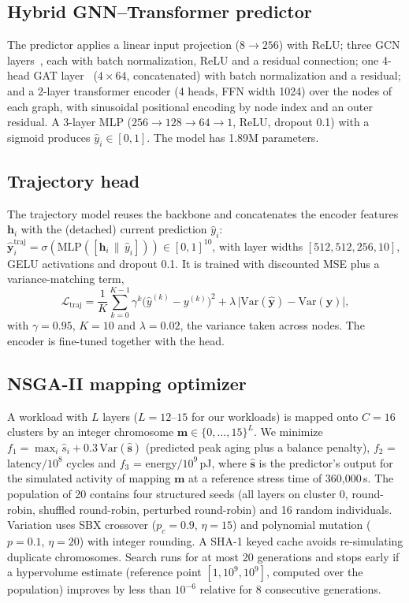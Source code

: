 \documentclass[conference]{IEEEtran}
\begin{document}
\subsection{Hybrid GNN--Transformer predictor}
\label{sec:model}

The predictor applies a linear input projection ($8 \to 256$) with ReLU; three GCN layers~\cite{kipf2017gcn}, each with batch normalization, ReLU and a residual connection; one 4-head GAT layer~\cite{velickovic2018gat} ($4\times 64$, concatenated) with batch normalization and a residual; and a 2-layer transformer encoder (4 heads, FFN width 1024) over the nodes of each graph, with sinusoidal positional encoding by node index and an outer residual. A 3-layer MLP ($256 \to 128 \to 64 \to 1$, ReLU, dropout 0.1) with a sigmoid produces $\hat{y}_i \in [0,1]$. The model has 1.89M parameters.

\subsection{Trajectory head}
\label{sec:trajectory}

The trajectory model reuses the backbone and concatenates the encoder features $\mathbf{h}_i$ with the (detached) current prediction $\hat{y}_i$:
$\hat{\mathbf{y}}_i^{\text{traj}} = \sigma(\text{MLP}([\mathbf{h}_i \,\|\, \hat{y}_i])) \in [0,1]^{10}$, with layer widths $[512, 512, 256, 10]$, GELU activations and dropout 0.1. It is trained with discounted MSE plus a variance-matching term,
\begin{equation}
    \mathcal{L}_{\text{traj}} = \frac{1}{K} \sum_{k=0}^{K-1} \gamma^k \big(\hat{y}^{(k)} - y^{(k)}\big)^2 + \lambda \,\big|\text{Var}(\hat{\mathbf{y}}) - \text{Var}(\mathbf{y})\big|,
    \label{eq:traj_loss}
\end{equation}
with $\gamma = 0.95$, $K = 10$ and $\lambda = 0.02$, the variance taken across nodes. The encoder is fine-tuned together with the head.

\subsection{NSGA-II mapping optimizer}
\label{sec:nsga}

A workload with $L$ layers ($L = 12$--$15$ for our workloads) is mapped onto $C = 16$ clusters by an integer chromosome $\mathbf{m} \in \{0,\ldots,15\}^L$. We minimize
$f_1 = \max_i \hat{s}_i + 0.3\,\text{Var}(\hat{\mathbf{s}})$ (predicted peak aging plus a balance penalty), $f_2$ = latency$/10^8$ cycles and $f_3$ = energy$/10^9$\,pJ, where $\hat{\mathbf{s}}$ is the predictor's output for the simulated activity of mapping $\mathbf{m}$ at a reference stress time of 360{,}000\,s. The population of 20 contains four structured seeds (all layers on cluster 0, round-robin, shuffled round-robin, perturbed round-robin) and 16 random individuals. Variation uses SBX crossover ($p_c = 0.9$, $\eta = 15$) and polynomial mutation ($p = 0.1$, $\eta = 20$) with integer rounding. A SHA-1 keyed cache avoids re-simulating duplicate chromosomes. Search runs for at most 20 generations and stops early if a hypervolume estimate (reference point $[1, 10^9, 10^9]$, computed over the population) improves by less than $10^{-6}$ relative for 8 consecutive generations.
\end{document}
